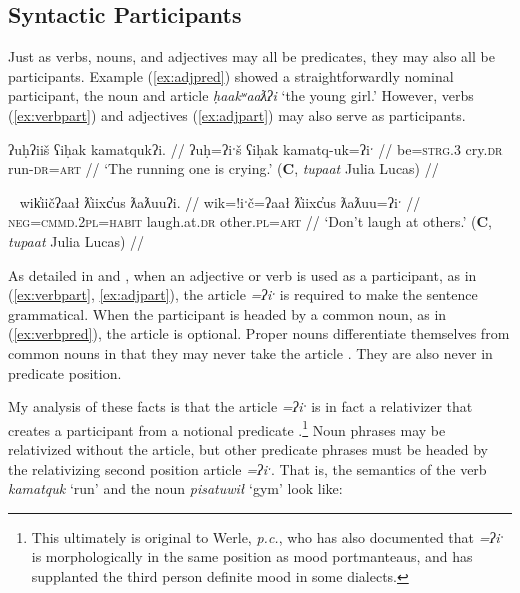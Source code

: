 \subsection{Syntactic Participants} \label{ch:clause:partp}

Just as verbs, nouns, and adjectives may all be predicates, they may also all be participants. Example (\ref{ex:adjpred}) showed a straightforwardly nominal participant, the noun and article \textit{ḥaakʷaaƛʔi} `the young girl.' However, verbs (\ref{ex:verbpart}) and adjectives (\ref{ex:adjpart}) may also serve as participants.

\ex \label{ex:verbpart}
\begingl
\glpreamble ʔuḥʔiiš ʕiḥak kamatqukʔi. //
\gla ʔuḥ=ʔiˑš ʕiḥak kamatq-uk=ʔiˑ //
\glb be=\textsc{strg.3} cry.\textsc{dr} run-\textsc{dr}=\textsc{art} //
\glft `The running one is crying.' (\textbf{C}, \textit{tupaat} Julia Lucas) //
\endgl
\xe

\ex~ \label{ex:adjpart}
\begingl
\glpreamble wik̓iičʔaał ƛ̓iixc̓us ƛaƛuuʔi. //
\gla wik=!iˑč=ʔaał ƛ̓iixc̓us ƛaƛuu=ʔiˑ //
\glb \textsc{neg}=\textsc{cmmd.2pl}=\textsc{habit} laugh.at.\textsc{dr} other.\textsc{pl}=\textsc{art} //
\glft `Don't laugh at others.' (\textbf{C}, \textit{tupaat} Julia Lucas) //
\endgl
\xe


As detailed in \cite{jacobsen1979} and \cite{wojdak2001}, when an adjective or verb is used as a participant, as in (\ref{ex:verbpart}, \ref{ex:adjpart}), the article \textit{=ʔiˑ} is required to make the sentence grammatical. When the participant is headed by a common noun, as in (\ref{ex:verbpred}), the article is optional. Proper nouns differentiate themselves from common nouns in that they may never take the article \citep{inman2018}. They are also never in predicate position.

My analysis of these facts is that the article \textit{=ʔiˑ} is in fact a relativizer that creates a participant from a notional predicate \cite{inman2018}.\footnote{This ultimately is original to Werle, \textit{p.c.}, who has also documented that \textit{=ʔiˑ} is morphologically in the same position as mood portmanteaus, and has supplanted the third person definite mood in some dialects.} Noun phrases may be relativized without the article, but other predicate phrases must be headed by the relativizing second position article \textit{=ʔiˑ}. That is, the semantics of the verb \textit{kamatquk} `run' and the noun \textit{pisatuwił} `gym' look like:


